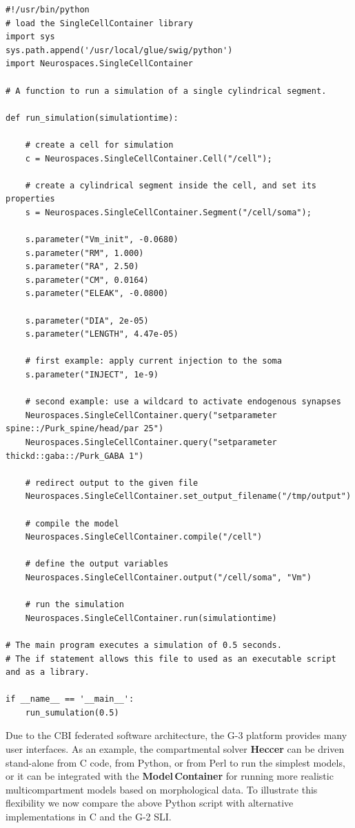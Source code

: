 \documentclass[12pt]{article}
\begin{document}
{\vspace*{1mm}
 { \footnotesize
  \linenumbers
  {\begin{verbatim}
#!/usr/bin/python
# load the SingleCellContainer library
import sys
sys.path.append('/usr/local/glue/swig/python')
import Neurospaces.SingleCellContainer

# A function to run a simulation of a single cylindrical segment.

def run_simulation(simulationtime):
   
    # create a cell for simulation
    c = Neurospaces.SingleCellContainer.Cell("/cell");

    # create a cylindrical segment inside the cell, and set its properties
    s = Neurospaces.SingleCellContainer.Segment("/cell/soma");

    s.parameter("Vm_init", -0.0680)
    s.parameter("RM", 1.000)
    s.parameter("RA", 2.50)
    s.parameter("CM", 0.0164)
    s.parameter("ELEAK", -0.0800)

    s.parameter("DIA", 2e-05)
    s.parameter("LENGTH", 4.47e-05)

    # first example: apply current injection to the soma
    s.parameter("INJECT", 1e-9)

    # second example: use a wildcard to activate endogenous synapses
    Neurospaces.SingleCellContainer.query("setparameter spine::/Purk_spine/head/par 25")
    Neurospaces.SingleCellContainer.query("setparameter thickd::gaba::/Purk_GABA 1")
    
    # redirect output to the given file
    Neurospaces.SingleCellContainer.set_output_filename("/tmp/output")
    
    # compile the model
    Neurospaces.SingleCellContainer.compile("/cell")
    
    # define the output variables
    Neurospaces.SingleCellContainer.output("/cell/soma", "Vm")
    
    # run the simulation
    Neurospaces.SingleCellContainer.run(simulationtime)

# The main program executes a simulation of 0.5 seconds.
# The if statement allows this file to used as an executable script and as a library.

if __name__ == '__main__':
    run_sumulation(0.5) 
\end{verbatim}
  \vspace*{1mm} }}}

Due to the CBI federated software architecture, the G-3 platform provides many user
interfaces.  As an example, the compartmental solver {\bf Heccer} can be driven
stand-alone from C code, from Python, or from Perl to run the simplest
models, or it can be integrated with the {\bf Model\,Container} for
running more realistic multicompartment models based on morphological
data.  To illustrate this flexibility we now compare the above Python
script with alternative implementations in C and the G-2 SLI.
\end{document}
